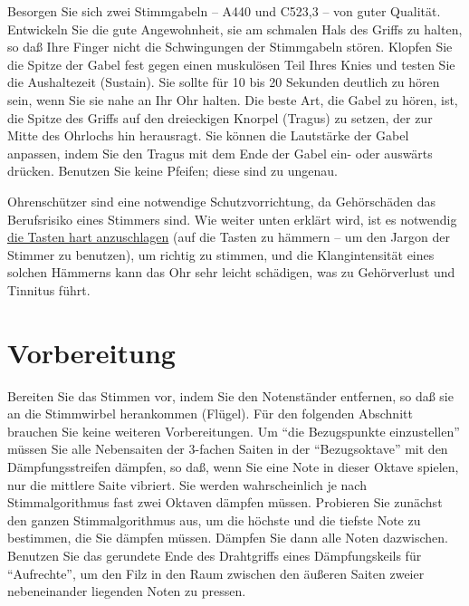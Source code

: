 \label{c2_3_gabel}

Besorgen Sie sich zwei Stimmgabeln -- A440 und C523,3 -- von guter Qualität.
Entwickeln Sie die gute Angewohnheit, sie am schmalen Hals des Griffs zu halten, so daß Ihre Finger nicht die Schwingungen der Stimmgabeln stören.
Klopfen Sie die Spitze der Gabel fest gegen einen muskulösen Teil Ihres Knies und testen Sie die Aushaltezeit (Sustain).
Sie sollte für 10 bis 20 Sekunden deutlich zu hören sein, wenn Sie sie nahe an Ihr Ohr halten.
Die beste Art, die Gabel zu hören, ist, die Spitze des Griffs auf den dreieckigen Knorpel (Tragus) zu setzen, der zur Mitte des Ohrlochs hin herausragt.
Sie können die Lautstärke der Gabel anpassen, indem Sie den Tragus mit dem Ende der Gabel ein- oder auswärts drücken.
Benutzen Sie keine Pfeifen; diese sind zu ungenau.

Ohrenschützer sind eine notwendige Schutzvorrichtung, da Gehörschäden das Berufsrisiko eines Stimmers sind.
Wie weiter unten erklärt wird, ist es notwendig \hyperref[c2_5_infi]{die Tasten hart anzuschlagen} (auf die Tasten zu hämmern -- um den Jargon der Stimmer zu benutzen), um richtig zu stimmen, und die Klangintensität eines solchen Hämmerns kann das Ohr sehr leicht schädigen, was zu Gehörverlust und Tinnitus führt.
 

\section{Vorbereitung}
\label{c2_4}

Bereiten Sie das Stimmen vor, indem Sie den Notenständer entfernen, so daß sie an die Stimmwirbel herankommen (Flügel).
Für den folgenden Abschnitt brauchen Sie keine weiteren Vorbereitungen.
Um \enquote{die Bezugspunkte einzustellen} müssen Sie alle Nebensaiten der 3-fachen Saiten in der \enquote{Bezugsoktave} mit den Dämpfungsstreifen dämpfen, so daß, wenn Sie eine Note in dieser Oktave spielen, nur die mittlere Saite vibriert.
Sie werden wahrscheinlich je nach Stimmalgorithmus fast zwei Oktaven dämpfen müssen.
Probieren Sie zunächst den ganzen Stimmalgorithmus aus, um die höchste und die tiefste Note zu bestimmen, die Sie dämpfen müssen.
Dämpfen Sie dann alle Noten dazwischen.
Benutzen Sie das gerundete Ende des Drahtgriffs eines Dämpfungskeils für \enquote{Aufrechte}, um den Filz in den Raum zwischen den äußeren Saiten zweier nebeneinander liegenden Noten zu pressen.
 


